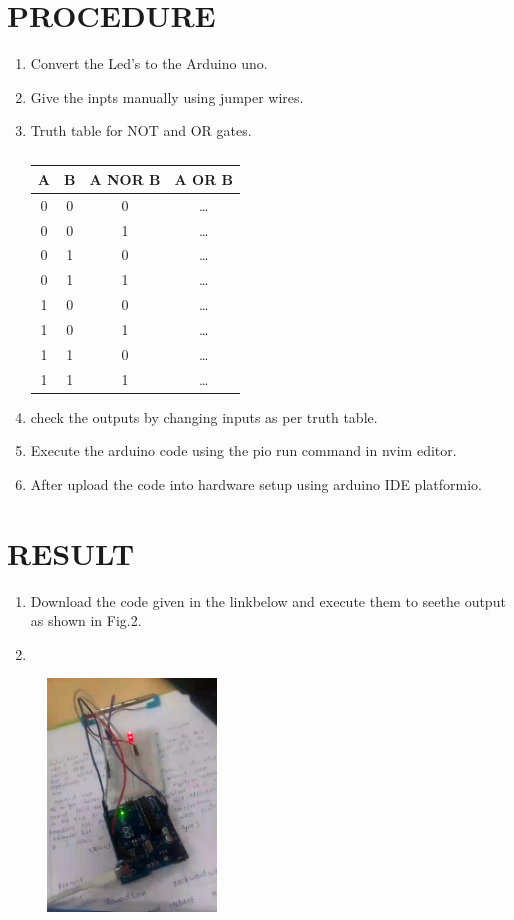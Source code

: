 \documentclass[conference]{IEEEtran}                   \IEEEoverridecommandlockouts
\begin{document}
\section{PROCEDURE}
\begin{enumerate}
	\item Convert the Led's to the Arduino uno.
	\item Give the inpts manually using jumper wires.
	\item Truth table for NOT and OR gates.
		\begin{table}[htbp]
			\centering
		


\begin{tabular}{|c|c|c|c|}
\hline
	A & B & A NOR B & A OR B \\
\hline
0 & 0 & 0 & \ldots \\
0 & 0 & 1 & \ldots \\
0 & 1 & 0 & \ldots \\
0 & 1 & 1 & \ldots \\
1 & 0 & 0 & \ldots \\
1 & 0 & 1 & \ldots \\
1 & 1 & 0 & \ldots \\
1 & 1 & 1 & \ldots \\
\hline
\end{tabular}
		
	\vspace{0.1cm}
	\caption{\label{tab:widgets}}
		\end{table}
	\item check the outputs by changing inputs as per truth table.
	\item Execute the arduino code using the pio run command in nvim editor.
	\item After upload the code into hardware setup using arduino IDE platformio.
\end{enumerate}
\section{RESULT}
\begin{enumerate}
	\item Download the code given in the linkbelow and execute them to seethe output as shown in Fig.2.
	\item 
\end{enumerate}

\begin{figure}[h]
	\centering
	\includegraphics[width=0.4\textwidth]{2.jpg}
	\caption{\label{fig-5:Gates}}
\end{figure}
\end{document}

